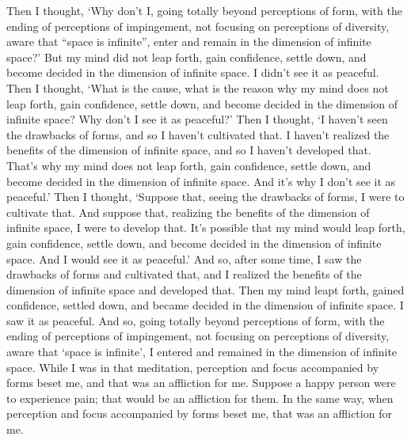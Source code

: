 \documentclass[12pt,openany]{book}%
\begin{document}
Then I thought, ‘Why don’t I, going totally beyond perceptions of form, with the ending of perceptions of impingement, not focusing on perceptions of diversity, aware that “space is infinite”, enter and remain in the dimension of infinite space?’ But my mind did not leap forth, gain confidence, settle down, and become decided in the dimension of infinite space. I didn’t see it as peaceful. Then I thought, ‘What is the cause, what is the reason why my mind does not leap forth, gain confidence, settle down, and become decided in the dimension of infinite space? Why don’t I see it as peaceful?’ Then I thought, ‘I haven’t seen the drawbacks of forms, and so I haven’t cultivated that. I haven’t realized the benefits of the dimension of infinite space, and so I haven’t developed that. That’s why my mind does not leap forth, gain confidence, settle down, and become decided in the dimension of infinite space. And it’s why I don’t see it as peaceful.’ Then I thought, ‘Suppose that, seeing the drawbacks of forms, I were to cultivate that. And suppose that, realizing the benefits of the dimension of infinite space, I were to develop that. It’s possible that my mind would leap forth, gain confidence, settle down, and become decided in the dimension of infinite space. And I would see it as peaceful.’ And so, after some time, I saw the drawbacks of forms and cultivated that, and I realized the benefits of the dimension of infinite space and developed that. Then my mind leapt forth, gained confidence, settled down, and became decided in the dimension of infinite space. I saw it as peaceful. And so, going totally beyond perceptions of form, with the ending of perceptions of impingement, not focusing on perceptions of diversity, aware that ‘space is infinite’, I entered and remained in the dimension of infinite space. While I was in that meditation, perception and focus accompanied by forms beset me, and that was an affliction for me. Suppose a happy person were to experience pain; that would be an affliction for them. In the same way, when perception and focus accompanied by forms beset me, that was an affliction for me. 
\end{document}

